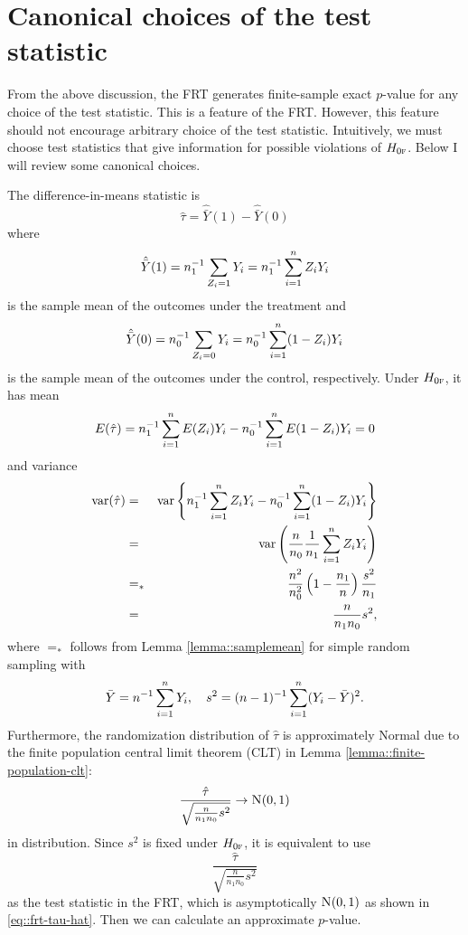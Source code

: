 \section{Canonical choices of the test statistic}
\label{sec::frt-choiceofstatistic}

From the above discussion, the FRT generates finite-sample exact $p$-value for any choice of the test statistic. This is a feature of the FRT. However, this feature should not encourage arbitrary choice of the test statistic. Intuitively, we must choose test statistics that give information for possible violations of $H_{0\textsc{f}}$.  Below I will review some canonical choices. 


\begin{example}\label{eq::frt-difference-in-means}
The difference-in-means statistic is
$$
\hat{\tau}   = \hat{\bar{Y}}(1) - \hat{\bar{Y}}(0)
$$
where
$$
 \hat{\bar{Y}}(1)  =  n_1^{-1} \sum_{Z_i=1} Y_i  = n_1^{-1} \sum_{i=1}^n Z_iY_i 
$$
is the sample mean of the outcomes under the treatment and
$$
\hat{\bar{Y}}(0) = n_0^{-1}  \sum_{Z_i=0} Y_i   = n_0^{-1}  \sum_{i=1}^n (1-Z_i) Y_i 
$$
is the sample mean of the outcomes under the control, respectively.
%
Under $H_{0\textsc{f}}$, it has mean 
$$
E(  \hat{\tau}    ) = n_1^{-1}\sum_{i=1}^n E(Z_i)Y_i  - n_0^{-1}  \sum_{i=1}^n E(1-Z_i) Y_i  = 0
$$
and variance
\begin{eqnarray*}
\textup{var}( \hat{\tau}   ) &=& \textup{var}\left\{  n_1^{-1} \sum_{i=1}^n Z_iY_i - n_0^{-1}  \sum_{i=1}^n (1-Z_i) Y_i  \right\} \\
&=&\textup{var}\left(  \frac{n}{n_0}    \frac{1}{n_1} \sum_{i=1}^n  Z_i Y_i         \right) \\
&=_*& \frac{n^2}{n_0^2} \left( 1 - \frac{n_1}{n} \right) \frac{s^2}{n_1} \\ 
&=& \frac{n}{n_1 n_0} s^2,
\end{eqnarray*}
where $=_*$ follows from Lemma  \ref{lemma::samplemean} for simple random sampling with
$$
\bar{Y} = n^{-1}  \sum_{i=1}^n Y_i,\quad 
s^2 = (n-1)^{-1} \sum_{i=1}^n (Y_i - \bar{Y})^2 .  
$$ 
Furthermore, the randomization distribution of $\hat{\tau}$ is approximately Normal due to the finite population central limit theorem (CLT) in Lemma \ref{lemma::finite-population-clt}: 
\begin{equation}\label{eq::frt-tau-hat}
\frac{  \hat{\tau}      }{  \sqrt{\frac{n}{n_1 n_0} s^2}    }  
\rightarrow  \N01 
\end{equation}
in distribution. Since $s^2$ is fixed under $H_{0\textsc{f}}$, it is equivalent to use 
$$
\frac{  \hat{\tau}      }{  \sqrt{\frac{n}{n_1 n_0} s^2}    }  
$$
as the test statistic in the FRT, which is asymptotically $\textsc{N}(0,1)$ as shown in \eqref{eq::frt-tau-hat}. Then we can calculate an approximate $p$-value. 
\end{example}


